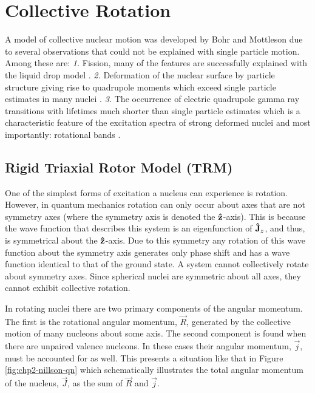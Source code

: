 \section{Collective Rotation}
\label{sec:models-rigid-rotor}
A model of collective nuclear motion was developed by Bohr and Mottleson \cite{bohrMottelsonArticle,bohrMottelson2} due to several observations that could not be explained with single particle motion. Among these are: \emph{1.} Fission, many of the features are successfully explained with the liquid drop model \cite{meitnerFissionProducts,fissionMechanism}. \emph{2.} Deformation of the nuclear surface by particle structure \cite{deformationPrediction} giving rise to quadrupole moments which exceed single particle estimates in many nuclei \cite{casimirQuadMoments,nuclearQuadMomentsAndShellStruc}. \emph{3.} The occurrence of electric quadrupole gamma ray transitions with lifetimes much shorter than single particle estimates \cite{nuclearIsomerClassification} which is a characteristic feature of the excitation spectra of strong deformed nuclei and most importantly: rotational bands \cite{QuadIsomerInterp}.
\subsection{Rigid Triaxial Rotor Model (TRM)}
\label{ssec:models-triaxial-rotor}
One of the simplest forms of excitation a nucleus can experience is rotation. However, in quantum mechanics rotation can only occur about axes that are not symmetry axes (where the symmetry axis is denoted the $\boldsymbol{\hat{\textbf{z}}}$-axis). This is because the wave function that describes this system is an eigenfunction of $\boldsymbol{\hat{\textbf{J}}}_z$, and thus, is symmetrical about the $\boldsymbol{\hat{\textbf{z}}}$-axis. Due to this symmetry any rotation of this wave function about the symmetry axis generates only phase shift and has a wave function identical to that of the ground state. A system cannot collectively rotate about symmetry axes. Since spherical nuclei are symmetric about all axes, they cannot exhibit collective rotation.

In rotating nuclei there are two primary components of the angular momentum. The first is the rotational angular momentum, $\vec{R}$, generated by the collective motion of many nucleons about some axis. The second component is found when there are unpaired valence nucleons. In these cases their angular momentum, $\vec{j}$, must be accounted for as well. This presents a situation like that in Figure \ref{fig:chp2-nillson-qn} which schematically illustrates the total angular momentum of the nucleus, $\vec{J}$, as the sum of $\vec{R}$ and $\vec{j}$.

